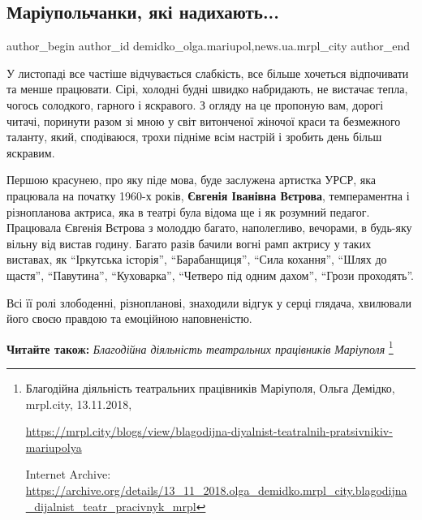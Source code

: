  
 
 
 
 
 
\subsection{Маріупольчанки, які надихають...}
\label{sec:23_11_2018.stz.news.ua.mrpl_city.1.mariupolchanky_jaki_nadyhajut}
 
\ifcmt
 author_begin
   author_id demidko_olga.mariupol,news.ua.mrpl_city
 author_end
\fi

У листопаді все частіше відчувається слабкість, все більше хочеться відпочивати
та менше працювати. Сірі, холодні будні швидко набридають, не вистачає тепла,
чогось солодкого, гарного і яскравого. З огляду на це пропоную вам, дорогі
читачі, поринути разом зі мною у світ витонченої жіночої краси та безмежного
таланту, який, сподіваюся, трохи підніме всім настрій і зробить день більш
яскравим.


Першою красунею, про яку піде мова, буде заслужена артистка УРСР, яка працювала
на початку 1960-х років, \textbf{Євгенія Іванівна Вєтрова}, темпераментна і
різнопланова актриса, яка в театрі була відома ще і як розумний педагог.
Працювала Євгенія Вєтрова з молоддю багато, наполегливо, вечорами, в будь-яку
вільну від вистав годину. Багато разів бачили вогні рамп актрису у таких
виставах, як \enquote{Іркутська історія}, \enquote{Барабанщиця}, \enquote{Сила
кохання}, \enquote{Шлях до щастя}, \enquote{Павутина}, \enquote{Куховарка},
\enquote{Четверо під одним дахом}, \enquote{Грози проходять}.

Всі її ролі злободенні, різнопланові, знаходили відгук у серці глядача,
хвилювали його своєю правдою та емоційною наповненістю.

\textbf{Читайте також:} \emph{Благодійна діяльність театральних працівників Маріуполя}%
\footnote{Благодійна діяльність театральних працівників Маріуполя, Ольга Демідко, mrpl.city, 13.11.2018, \par
\url{https://mrpl.city/blogs/view/blagodijna-diyalnist-teatralnih-pratsivnikiv-mariupolya}\par
Internet Archive: \url{https://archive.org/details/13_11_2018.olga_demidko.mrpl_city.blagodijna_dijalnist_teatr_pracivnyk_mrpl}
}

